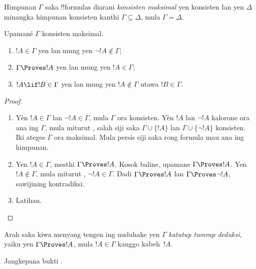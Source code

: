\documentclass[../../../include/open-logic-section]{subfiles}
\begin{document}


\begin{defn}
Himpunan $\Gamma$ saka !!{formula}s diarani \emph{konsisten maksimal}
yen konsisten lan yen $\Delta$ minangka himpunan konsisten kanthi
$\Gamma \subseteq \Delta$, mula $\Gamma = \Delta$.
\end{defn}

\begin{lem}
Upamané $\Gamma$ konsisten maksimal.
\begin{enumerate}
\item {} $!A \in \Gamma$ yen lan mung yen
  $\lnot !A \notin \Gamma$;
\item {} $\Gamma \Proves !A$ yen lan mung yen $!A \in \Gamma$;
\item {} $!A \lif !B \in \Gamma$ yen lan mung yen
  $!A \notin \Gamma$ utawa $!B \in \Gamma$.
\end{enumerate}
\end{lem}

\begin{proof}
\begin{enumerate}
\item Yèn $!A \in \Gamma$ lan $\lnot !A \in \Gamma$,
  mula $\Gamma$ ora konsisten. Yèn $!A$ lan $\lnot!A$
  kalorone ora ana ing $\Gamma$, mula miturut ,
  salah siji saka $\Gamma\cup\{!A\}$ lan $\Gamma \cup \{\lnot !A\}$
  konsisten. Iki ateges $\Gamma$ ora maksimal.
  Mula persis siji saka rong formula mau ana ing himpunan.
\item Yen $!A \in \Gamma$, mesthi $\Gamma \Proves !A$.
  Kosok baline, upamane $\Gamma \Proves !A$. Yen $!A \notin \Gamma$,
  mula miturut , $\lnot !A \in \Gamma$.
  Dadi $\Gamma \Proves !A$ lan $\Gamma \Proves \lnot !A$, sawijining kontradiksi.
\item Latihan.
\end{enumerate}
\end{proof}

Arah saka kiwa menyang tengen ing 
nuduhake yen $\Gamma$ \emph{katutup tumrap deduksi}, yaiku yen
$\Gamma \Proves !A$, mula $!A \in \Gamma$ kanggo kabeh~$!A$.

\begin{prob}
  Jangkepana bukti .
\end{prob}
\end{document}

